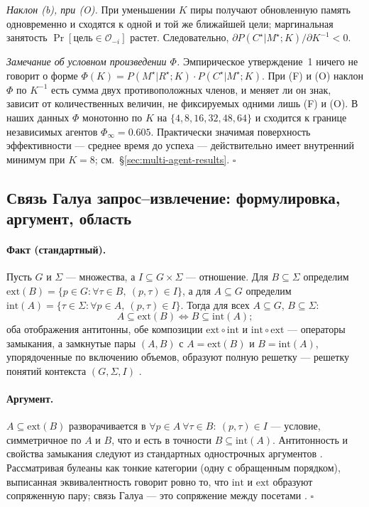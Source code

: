 \documentclass{article}
\begin{document}
\emph{Наклон (b), при (O).} При уменьшении $K$ пиры получают обновленную память одновременно и сходятся к одной и той же ближайшей цели; маргинальная занятость $\Pr[\text{цель}\in\mathcal{O}_{-i}]$ растет. Следовательно, $\partial P(C^\star|M^\star;K) / \partial K^{-1} < 0$.

\emph{Замечание об условном произведении $\Phi$.} Эмпирическое утверждение~1 ничего не говорит о форме $\Phi(K) = P(M^\star|R^\star;K)\!\cdot\!P(C^\star|M^\star;K)$. При (F) и (O) наклон $\Phi$ по $K^{-1}$ есть сумма двух противоположных членов, и меняет ли он знак, зависит от количественных величин, не фиксируемых одними лишь (F) и (O). В наших данных $\Phi$ монотонно по $K$ на $\{4,8,16,32,48,64\}$ и сходится к границе независимых агентов $\Phi_\infty = 0.605$. Практически значимая поверхность эффективности --- среднее время до успеха --- действительно имеет внутренний минимум при $K=8$; см.\ \S\ref{sec:multi-agent-results}. \hfill$\square$

\subsection{Связь Галуа запрос--извлечение: формулировка, аргумент, область}
\label{app:galois}

\paragraph{Факт (стандартный).}
Пусть $G$ и $\Sigma$ --- множества, а $I \subseteq G \times \Sigma$ --- отношение. Для $B \subseteq \Sigma$ определим $\mathrm{ext}(B) = \{p \in G : \forall \tau \in B,\ (p,\tau) \in I\}$, а для $A \subseteq G$ определим $\mathrm{int}(A) = \{\tau \in \Sigma : \forall p \in A,\ (p,\tau) \in I\}$. Тогда для всех $A \subseteq G$, $B \subseteq \Sigma$:
\[
A \subseteq \mathrm{ext}(B) \iff B \subseteq \mathrm{int}(A);
\]
оба отображения антитонны, обе композиции $\mathrm{ext}\circ\mathrm{int}$ и $\mathrm{int}\circ\mathrm{ext}$ --- операторы замыкания, а замкнутые пары $(A, B)$ с $A = \mathrm{ext}(B)$ и $B = \mathrm{int}(A)$, упорядоченные по включению объемов, образуют полную решетку --- решетку понятий контекста $(G, \Sigma, I)$ \citep{ganter1999fca}.

\paragraph{Аргумент.}
$A \subseteq \mathrm{ext}(B)$ разворачивается в $\forall p \in A\ \forall \tau \in B:\ (p,\tau) \in I$ --- условие, симметричное по $A$ и $B$, что и есть в точности $B \subseteq \mathrm{int}(A)$. Антитонность и свойства замыкания следуют из стандартных однострочных аргументов \citep[гл.~1]{ganter1999fca}. Рассматривая булеаны как тонкие категории (одну с обращенным порядком), выписанная эквивалентность говорит ровно то, что $\mathrm{int}$ и $\mathrm{ext}$ образуют сопряженную пару; связь Галуа --- это сопряжение между посетами \citep[гл.~IV]{maclane1998categories}. \hfill$\square$
\end{document}
